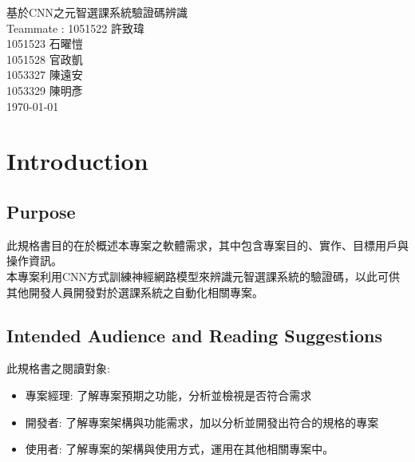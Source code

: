 \documentclass{scrreprt}
\date{}
\begin{document}
\begin{CJK}{UTF8}{nkai}

\begin{flushright}
    \begin{bfseries}
        \Huge{基於CNN之元智選課系統驗證碼辨識}\\

        \vspace{8cm}
       \vspace{0.2cm}
       Teammate : 1051522 許致瑋\\
       \vspace{0.2cm}
       1051523 石曜愷\\
\vspace{0.2cm}
       1051528 官政凱\\
\vspace{0.2cm}
       1053327 陳遠安\\
\vspace{0.2cm}
       1053329 陳明彥\\

        \vspace{1cm}
        \today\\
    \end{bfseries}
\end{flushright}

\tableofcontents


\chapter{Introduction}

\section{Purpose}

\setlength{\parindent}{1.5em}此規格書目的在於概述本專案之軟體需求，其中包含專案目的、實作、目標用戶與操作資訊。\\
\setlength{\parindent}{1.5em}本專案利用CNN方式訓練神經網路模型來辨識元智選課系統的驗證碼，以此可供其他開發人員開發對於選課系統之自動化相關專案。
\section{Intended Audience and Reading Suggestions}

此規格書之閱讀對象:
\begin{itemize}
  \item  專案經理: 了解專案預期之功能，分析並檢視是否符合需求
  \item 開發者: 了解專案架構與功能需求，加以分析並開發出符合的規格的專案
  \item 使用者: 了解專案的架構與使用方式，運用在其他相關專案中。
\end{itemize}
          

\end{CJK}
\end{document}
